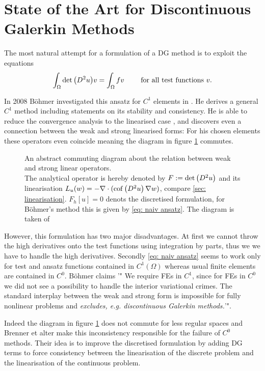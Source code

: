 \section{State of the Art for Discontinuous Galerkin Methods} %

The most natural attempt for a formulation of a DG method is to exploit the equations
\begin{align}
	\int_{\Omega} \det{\left(D^2 u\right)} v = \int_\Omega fv \qquad \text{ for all test functions } v. \label{eq: naiv ansatz}
\end{align}

In 2008 B\"ohmer investigated this ansatz for $C^1$ elements in \cite{Boehmer2008}. He derives a general $C^1$ method including statements on its stability and consistency. 
He is able to reduce the convergence analysis to the linearised case \cite[Section 9]{Boehmer2008}, and discovers even a connection between the weak and strong linearised forms: For his chosen elements these operators even coincide meaning the diagram in figure \ref{fig: fe diagram} commutes.
\begin{figure}[H]
	
	\label{fig: fe diagram}
	\caption{An abstract commuting diagram about the relation between weak and strong linear operators.\\ The analytical \MA operator is hereby denoted by $F:=\det{\left(D^2 u\right)}$ and its linearisation $L_u(w) = -\nabla \cdot (\operatorname{cof} \left( D^2 u \right) \nabla w)$, compare \ref{sec: linearisation}. $F_h[u]=0$ denots the discretised formulation, for B\"ohmer's method this is given by \eqref{eq: naiv ansatz}. The diagram is taken of \cite[Fig 2.2]{FGN2013}}
\end{figure}
However, this formulation has two major disadvantages. 
At first we cannot throw the high derivatives onto the test functions using integration by parts, thus we we have to handle the high derivatives. Secondly \eqref{eq: naiv ansatz} seems to work only for test and ansatz functions contained in $C^1(\Omega)$ whereas usual finite elements are contained in $C^0$. B\"ohmer claims '" We require FEs in $C^1$, since for FEs in $C^0$ we did not see a possibility to handle the interior variational crimes. The standard interplay between the weak and strong form is impossible for fully nonlinear problems and \emph{excludes, e.g. discontinuous Galerkin methods.}'"\cite[p.1214]{Boehmer2008}.

Indeed the diagram in figure \ref{fig: fe diagram} does not commute for less regular spaces and Brenner et alter make this inconsistency responsible for the failure of $C^0$ methods\cite{BGN+2011}. Their idea is to improve the discretised formulation by adding DG terms to force consistency between the linearisation of the discrete problem and the linearisation of the continuous problem.

